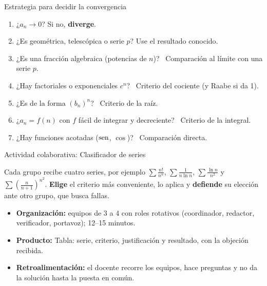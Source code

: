 \documentclass[10pt,aspectratio=169]{beamer}
\begin{document}
\begin{frame}{Estrategia para decidir la convergencia}
  \begin{enumerate}
    \item ¿$a_n\to0$? Si no, \textbf{diverge}.
    \item ¿Es geométrica, telescópica o serie $p$? Use el resultado conocido.
    \item ¿Es una fracción algebraica (potencias de $n$)? \ Comparación al límite con una serie $p$.
    \item ¿Hay factoriales o exponenciales $c^n$? \ Criterio del cociente (y Raabe si da 1).
    \item ¿Es de la forma $(b_n)^n$? \ Criterio de la raíz.
    \item ¿$a_n=f(n)$ con $f$ fácil de integrar y decreciente? \ Criterio de la integral.
    \item ¿Hay funciones acotadas ($\operatorname{sen}$, $\cos$)? \ Comparación directa.
  \end{enumerate}
  \begin{center}
  \end{center}
\end{frame}

\begin{frame}{Actividad colaborativa: Clasificador de series}
  \small
  \begin{activa}
    Cada grupo recibe cuatro series, por ejemplo $\sum\frac{n!}{n^n}$, $\sum\frac1{n\ln n}$, $\sum\frac{\ln n}{n^2}$ y $\sum\left(\frac n{n+1}\right)^{n^2}$. \textbf{Elige} el criterio más conveniente, lo aplica y \textbf{defiende} su elección ante otro grupo, que busca fallas.
  \end{activa}
  \begin{itemize}
    \item \textbf{Organización:} equipos de 3 a 4 con roles rotativos (coordinador, redactor, verificador, portavoz); 12--15 minutos.
    \item \textbf{Producto:} Tabla: serie, criterio, justificación y resultado, con la objeción recibida.
    \item \textbf{Retroalimentación:} el docente recorre los equipos, hace preguntas y no da la solución hasta la puesta en común.
  \end{itemize}
\end{frame}
\end{document}
